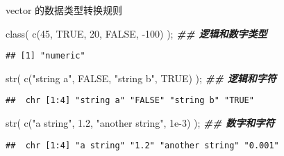 \documentclass[ignorenonframetext,]{beamer}
\newenvironment{Shaded}{\begin{snugshade}}{\end{snugshade}}
\newcommand{\ConstantTok}[1]{\textcolor[rgb]{0.00,0.00,0.00}{#1}}
\newcommand{\DecValTok}[1]{\textcolor[rgb]{0.00,0.00,0.81}{#1}}
\newcommand{\DocumentationTok}[1]{\textcolor[rgb]{0.56,0.35,0.01}{\textbf{\textit{#1}}}}
\newcommand{\FloatTok}[1]{\textcolor[rgb]{0.00,0.00,0.81}{#1}}
\newcommand{\FunctionTok}[1]{\textcolor[rgb]{0.00,0.00,0.00}{#1}}
\newcommand{\NormalTok}[1]{#1}
\newcommand{\SpecialCharTok}[1]{\textcolor[rgb]{0.00,0.00,0.00}{#1}}
\newcommand{\StringTok}[1]{\textcolor[rgb]{0.31,0.60,0.02}{#1}}
\newcommand\FontSmall{\fontsize{7}{8}\selectfont}
\begin{document}
\begin{frame}[fragile]{vector 的数据类型转换规则}
\protect\hypertarget{vector-ux7684ux6570ux636eux7c7bux578bux8f6cux6362ux89c4ux5219-1}{}
\FontSmall

\begin{Shaded}
\begin{Highlighting}[]
\FunctionTok{class}\NormalTok{( }\FunctionTok{c}\NormalTok{(}\DecValTok{45}\NormalTok{, }\ConstantTok{TRUE}\NormalTok{, }\DecValTok{20}\NormalTok{, }\ConstantTok{FALSE}\NormalTok{, }\SpecialCharTok{{-}}\DecValTok{100}\NormalTok{) ); }\DocumentationTok{\#\# 逻辑和数字类型}
\end{Highlighting}
\end{Shaded}

\begin{verbatim}
## [1] "numeric"
\end{verbatim}

\begin{Shaded}
\begin{Highlighting}[]
\FunctionTok{str}\NormalTok{( }\FunctionTok{c}\NormalTok{(}\StringTok{"string a"}\NormalTok{, }\ConstantTok{FALSE}\NormalTok{, }\StringTok{"string b"}\NormalTok{, }\ConstantTok{TRUE}\NormalTok{) ); }\DocumentationTok{\#\# 逻辑和字符}
\end{Highlighting}
\end{Shaded}

\begin{verbatim}
##  chr [1:4] "string a" "FALSE" "string b" "TRUE"
\end{verbatim}

\begin{Shaded}
\begin{Highlighting}[]
\FunctionTok{str}\NormalTok{( }\FunctionTok{c}\NormalTok{(}\StringTok{"a string"}\NormalTok{, }\FloatTok{1.2}\NormalTok{, }\StringTok{"another string"}\NormalTok{, }\FloatTok{1e{-}3}\NormalTok{) ); }\DocumentationTok{\#\# 数字和字符}
\end{Highlighting}
\end{Shaded}

\begin{verbatim}
##  chr [1:4] "a string" "1.2" "another string" "0.001"
\end{verbatim}
\end{frame}
\end{document}
